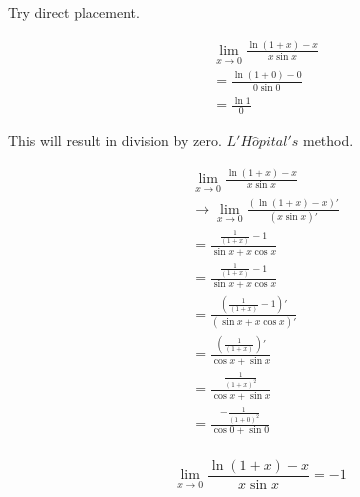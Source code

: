 Try direct placement.

\begin{align}
    &\lim_{x \rightarrow 0} \frac{\ln{(1 + x)} - x}{x\sin{x}} \\
    &= \frac{\ln{(1 + 0)} - 0}{0\sin{0}} \\
    &= \frac{\ln{1}}{0}
\end{align}

This will result in division by zero. $L'H\hat{o}pital's$ method.

\begin{align}
    &\lim_{x \rightarrow 0} \frac{\ln{(1 + x)} - x}{x\sin{x}} \\
    &\rightarrow \lim_{x \rightarrow 0} \frac{ (\ln{(1 + x) } - x )'}{(x\sin{x})' } \\
    &= \frac{ \frac{1}{(1 + x)} - 1}{ \sin{x} + x\cos{x} } \\
    &= \frac{ \frac{1}{(1 + x)} - 1}{ \sin{x} + x\cos{x} } \\
    &= \frac{( \frac{1}{(1 + x)} - 1 )'}{( \sin{x} + x\cos{x} )'} \\
    &= \frac{( \frac{1}{(1 + x)} )'}{\cos{x} + \sin{x}} \\
    &= \frac{\frac{1}{(1 + x)^2}}{\cos{x} + \sin{x}} \\
    &= \frac{-\frac{1}{(1 + 0)^2}}{\cos{0} + \sin{0}} \\
\end{align}

$$ 
    \lim_{x \rightarrow 0} \frac{\ln{(1 + x)} - x}{x\sin{x}} = -1
$$
